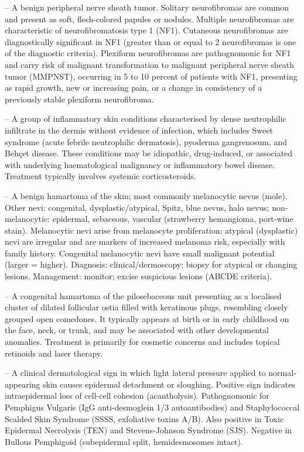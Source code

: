 -- A benign peripheral nerve sheath tumor. Solitary neurofibromas are common and present as soft, flesh-colored papules or nodules. Multiple neurofibromas are characteristic of neurofibromatosis type 1 (NF1). Cutaneous neurofibromas are diagnostically significant in NF1 (greater than or equal to 2 neurofibromas is one of the diagnostic criteria). Plexiform neurofibromas are pathognomonic for NF1 and carry risk of malignant transformation to malignant peripheral nerve sheath tumor (MMPNST), occurring in 5 to 10 percent of patients with NF1, presenting as rapid growth, new or increasing pain, or a change in consistency of a previously stable plexiform neurofibroma.

-- A group of inflammatory skin conditions characterised by dense neutrophilic infiltrate in the dermis without evidence of infection, which includes Sweet syndrome (acute febrile neutrophilic dermatosis), pyoderma gangrenosum, and Behçet disease. These conditions may be idiopathic, drug-induced, or associated with underlying haematological malignancy or inflammatory bowel disease. Treatment typically involves systemic corticosteroids.

-- A benign hamartoma of the skin; most commonly melanocytic nevus (mole). Other nevi: congenital, dysplastic/atypical, Spitz, blue nevus, halo nevus; non-melanocytic: epidermal, sebaceous, vascular (strawberry hemangioma, port-wine stain). Melanocytic nevi arise from melanocyte proliferation; atypical (dysplastic) nevi are irregular and are markers of increased melanoma risk, especially with family history. Congenital melanocytic nevi have small malignant potential (larger = higher). Diagnosis: clinical/dermoscopy; biopsy for atypical or changing lesions. Management: monitor; excise suspicious lesions (ABCDE criteria).

-- A congenital hamartoma of the pilosebaceous unit presenting as a localised cluster of dilated follicular ostia filled with keratinous plugs, resembling closely grouped open comedones. It typically appears at birth or in early childhood on the face, neck, or trunk, and may be associated with other developmental anomalies. Treatment is primarily for cosmetic concerns and includes topical retinoids and laser therapy.

-- A clinical dermatological sign in which light lateral pressure applied to normal-appearing skin causes epidermal detachment or sloughing. Positive sign indicates intraepidermal loss of cell-cell cohesion (acantholysis). Pathognomonic for Pemphigus Vulgaris (IgG anti-desmoglein 1/3 autoantibodies) and Staphylococcal Scalded Skin Syndrome (SSSS, exfoliative toxins A/B). Also positive in Toxic Epidermal Necrolysis (TEN) and Stevens-Johnson Syndrome (SJS). Negative in Bullous Pemphigoid (subepidermal split, hemidesmosomes intact).

